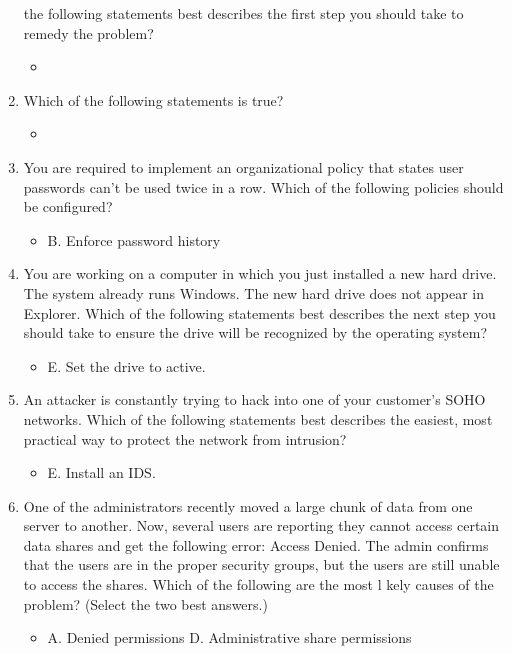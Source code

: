 \documentclass{article}
\begin{document}
\begin{enumerate}
the following statements best describes the first step you should
take to remedy the problem?
    \begin{itemize}
        \item 
    \end{itemize}
    \item Which of the following statements is true?
    \begin{itemize}
        \item 
    \end{itemize}
    \item You are required to implement an organizational policy that states
user passwords can’t be used twice in a row. Which of the following
policies should be configured?
    \begin{itemize}
        \item B. Enforce password history
    \end{itemize}
    \item You are working on a computer in which you just installed a new
hard drive. The system already runs Windows. The new hard drive
does not appear in Explorer. Which of the following statements
best describes the next step you should take to ensure the drive
will be recognized by the operating system?
    \begin{itemize}
        \item E. Set the drive to active.
    \end{itemize}
    \item An attacker is constantly trying to hack into one of your customer’s
SOHO networks. Which of the following statements best describes
the easiest, most practical way to protect the network from
intrusion?
    \begin{itemize}
        \item E. Install an IDS.
    \end{itemize}
    \item One of the administrators recently moved a large chunk of data
from one server to another. Now, several users are reporting they
cannot access certain data shares and get the following error:
Access Denied. The admin confirms that the users are in the
proper security groups, but the users are still unable to access the
shares. Which of the following are the most l kely causes of the
problem? (Select the two best answers.)
    \begin{itemize}
        \item A. Denied permissions D. Administrative share permissions
    \end{itemize}

\end{enumerate}
\end{document}

